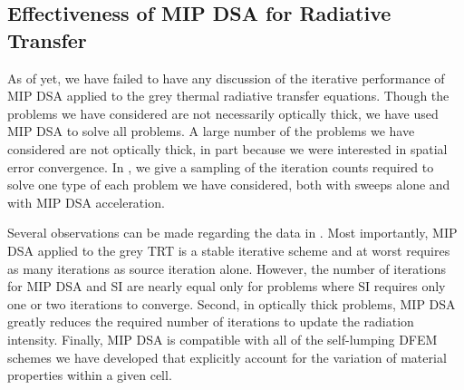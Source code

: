\subsection{Effectiveness of MIP DSA for Radiative Transfer}

As of yet, we have failed to have any discussion of the iterative performance of MIP DSA applied to the grey thermal radiative transfer equations.
Though the problems we have considered are not necessarily optically thick, we have used MIP DSA to solve all problems.
A large number of the problems we have considered are not optically thick, in part because we were interested in spatial error convergence.
In , we give a sampling of the iteration counts required to solve one type of each problem we have considered, both with sweeps alone and with MIP DSA acceleration.

Several observations can be made regarding the data in .  
Most importantly, MIP DSA applied to the grey TRT is a stable iterative scheme and at worst requires as many iterations as source iteration alone.
However, the number of iterations for MIP DSA and SI are nearly equal only for problems where SI requires only one or two iterations to converge.
Second, in optically thick problems, MIP DSA greatly reduces the required number of iterations to update the radiation intensity.
Finally, MIP DSA is compatible with all of the self-lumping DFEM schemes we have developed that explicitly account for the variation of material properties within a given cell.

